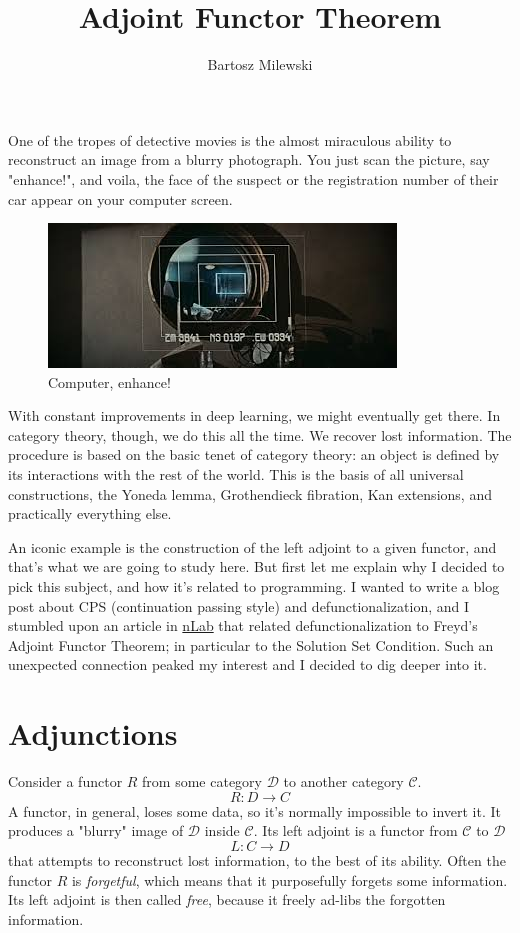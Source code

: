 \documentclass[11pt]{amsart}
\author{Bartosz Milewski}
\title{Adjoint Functor Theorem}
\begin{document}
\maketitle{}

One of the tropes of detective movies is the almost miraculous ability to reconstruct an image from a blurry photograph. You just scan the picture,  say "enhance!", and voila, the face of the suspect or the registration number of their car appear on your computer screen. 

\begin{figure}[h]
\includegraphics{BladeRunner.jpeg}
\caption{Computer, enhance!}
\end{figure}

With constant improvements in deep learning, we might eventually get there. In category theory, though, we do this all the time. We recover lost information. The procedure is based on the basic tenet of category theory: an object is defined by its interactions with the rest of the world. This is the basis of all universal constructions, the Yoneda lemma, Grothendieck fibration, Kan extensions, and practically everything else. 

An iconic example is the construction of the left adjoint to a given functor, and that's what we are going to study here. But first let me explain why I decided to pick this subject, and how it's related to programming. I wanted to write a blog post about CPS (continuation passing style) and defunctionalization, and I stumbled upon an article in \href{https://ncatlab.org/nlab/show/defunctionalization}{nLab} that related defunctionalization to Freyd's Adjoint Functor Theorem; in particular to the Solution Set Condition. Such an unexpected connection peaked my interest and I decided to dig deeper into it.

\section{Adjunctions}

Consider a functor $R$ from some category $\mathcal D$ to another category $\mathcal C$. 
\[R \colon D \to C \]
A functor, in general, loses some data, so it's normally impossible to invert it. It produces a "blurry" image of $\mathcal D$ inside $\mathcal C$. Its left adjoint is a functor from $\mathcal C$ to $\mathcal D$ 
\[ L \colon C \to D\]
that attempts to reconstruct lost information, to the best of its ability. Often the functor $R$ is \emph{forgetful}, which means that it purposefully forgets some information. Its left adjoint is then called \emph{free}, because it freely ad-libs the forgotten information. 
\end{document}
